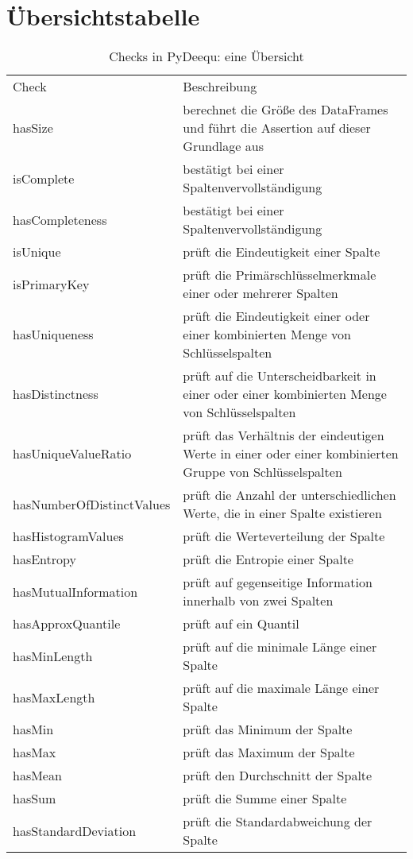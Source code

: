 \section{Übersichtstabelle}

{\tiny 
\begin{table}
 \caption{Checks in PyDeequ: eine Übersicht}
\begin{tabular}{ll}
Check &	Beschreibung \\
hasSize & berechnet die Größe des DataFrames und führt die Assertion auf dieser Grundlage aus\\
isComplete & bestätigt bei einer Spaltenvervollständigung\\
hasCompleteness	& bestätigt bei einer Spaltenvervollständigung\\
isUnique & prüft die Eindeutigkeit einer Spalte\\
isPrimaryKey & prüft die Primärschlüsselmerkmale einer oder mehrerer Spalten\\
hasUniqueness & prüft die Eindeutigkeit einer oder einer kombinierten Menge von Schlüsselspalten\\
hasDistinctness & prüft auf die Unterscheidbarkeit in einer oder einer kombinierten Menge von Schlüsselspalten\\
hasUniqueValueRatio & prüft das Verhältnis der eindeutigen Werte in einer oder einer kombinierten Gruppe von Schlüsselspalten\\
hasNumberOfDistinctValues & prüft die Anzahl der unterschiedlichen Werte, die in einer Spalte existieren\\
hasHistogramValues & prüft die Werteverteilung der Spalte\\
hasEntropy & prüft die Entropie einer Spalte\\
hasMutualInformation & prüft auf gegenseitige Information innerhalb von zwei Spalten\\
hasApproxQuantile & prüft auf ein Quantil\\
hasMinLength & prüft auf die minimale Länge einer Spalte\\
hasMaxLength & prüft auf die maximale Länge einer Spalte\\
hasMin & prüft das Minimum der Spalte\\
hasMax & prüft das Maximum der Spalte\\
hasMean & prüft den Durchschnitt der Spalte\\
hasSum & prüft die Summe einer Spalte\\
hasStandardDeviation & prüft die Standardabweichung der Spalte\\

\end{tabular}
\end{table}}
